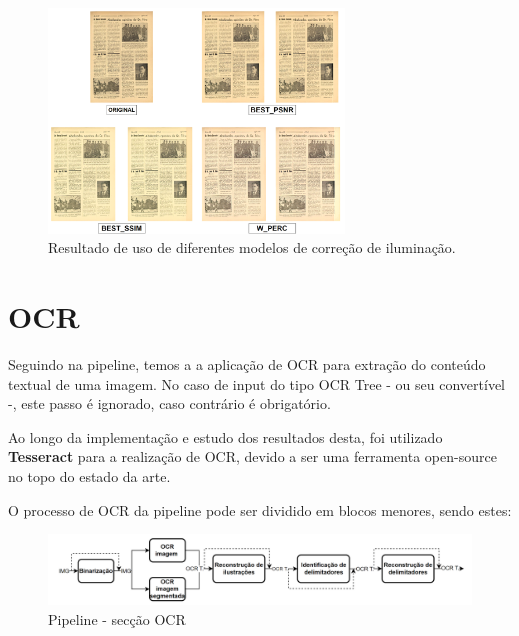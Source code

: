 \begin{figure}[H]
	\centering
	\includegraphics[width=0.7\textwidth]{images/ilustracoes/fix_illumination_example.png}
	\caption{Resultado de uso de diferentes modelos de correção de iluminação.}
	\label{fig:fix_illumination_example}
\end{figure}


\section{OCR}


Seguindo na pipeline, temos a a aplicação de OCR para extração do conteúdo textual de uma imagem. No caso de input do tipo OCR Tree - ou seu convertível -, este passo é ignorado, caso contrário é obrigatório.


Ao longo da implementação e estudo dos resultados desta, foi utilizado \textbf{Tesseract} para a realização de OCR, devido a ser uma ferramenta open-source no topo do estado da arte.

O processo de OCR da pipeline pode ser dividido em blocos menores, sendo estes:

\begin{figure}[H]
	\centering
	\includegraphics[width=1\textwidth]{images/diagramas/arquitetura_pipeline_ocr.png}
	\caption{Pipeline - secção OCR}
	\label{fig:arquitetura_pipeline_ocr}
\end{figure}


